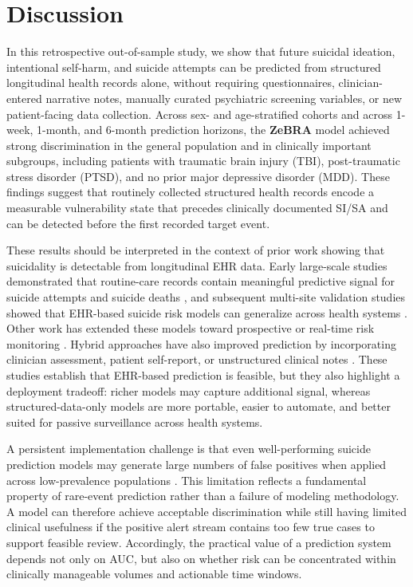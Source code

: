 \documentclass[onecolumn, compsoc,11pt]{IEEEtran}
\def\zebra{\textbf{ZeBRA}\xspace}
\def\zebra{\textbf{ZeBRA}\xspace}
\begin{document}
\section*{Discussion}

In this retrospective out-of-sample study, we show that future suicidal ideation, intentional self-harm, and suicide attempts can be predicted from structured longitudinal health records alone, without requiring questionnaires, clinician-entered narrative notes, manually curated psychiatric screening variables, or new patient-facing data collection. Across sex- and age-stratified cohorts and across 1-week, 1-month, and 6-month prediction horizons, the \zebra model achieved strong discrimination in the general population and in clinically important subgroups, including patients with traumatic brain injury (TBI), post-traumatic stress disorder (PTSD), and no prior major depressive disorder (MDD). These findings suggest that routinely collected structured health records encode a measurable vulnerability state that precedes clinically documented SI/SA and can be detected before the first recorded target event.

These results should be interpreted in the context of prior work showing that suicidality is detectable from longitudinal EHR data. Early large-scale studies demonstrated that routine-care records contain meaningful predictive signal for suicide attempts and suicide deaths \cite{simon2018predicting,barakcorren2017}, and subsequent multi-site validation studies showed that EHR-based suicide risk models can generalize across health systems \cite{barakcorren2020,barakcorren2020validation}. Other work has extended these models toward prospective or real-time risk monitoring \cite{walsh2017,walsh2021,walsh2021predicting}. Hybrid approaches have also improved prediction by incorporating clinician assessment, patient self-report, or unstructured clinical notes \cite{nock2022,tsui2021natural,tsui2021,obeid2020identifying}. These studies establish that EHR-based prediction is feasible, but they also highlight a deployment tradeoff: richer models may capture additional signal, whereas structured-data-only models are more portable, easier to automate, and better suited for passive surveillance across health systems.

A persistent implementation challenge is that even well-performing suicide prediction models may generate large numbers of false positives when applied across low-prevalence populations \cite{belsher2019prediction}. This limitation reflects a fundamental property of rare-event prediction rather than a failure of modeling methodology. A model can therefore achieve acceptable discrimination while still having limited clinical usefulness if the positive alert stream contains too few true cases to support feasible review. Accordingly, the practical value of a prediction system depends not only on AUC, but also on whether risk can be concentrated within clinically manageable volumes and actionable time windows.
\end{document}
